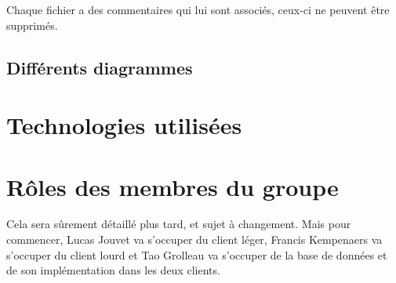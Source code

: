 \documentclass[a4paper, 12pt]{article}
\begin{document}
Chaque fichier a des commentaires qui lui sont associés, ceux-ci ne peuvent être supprimés.

\subsection{Différents diagrammes}

\section{Technologies utilisées}

\section{Rôles des membres du groupe}

Cela sera sûrement détaillé plus tard, et sujet à changement.
Mais pour commencer, Lucas Jouvet va s'occuper du client léger, Francis Kempenaers va s'occuper du client lourd et Tao Grolleau va s'occuper de la base de données et de son implémentation dans les deux clients.
\end{document}
